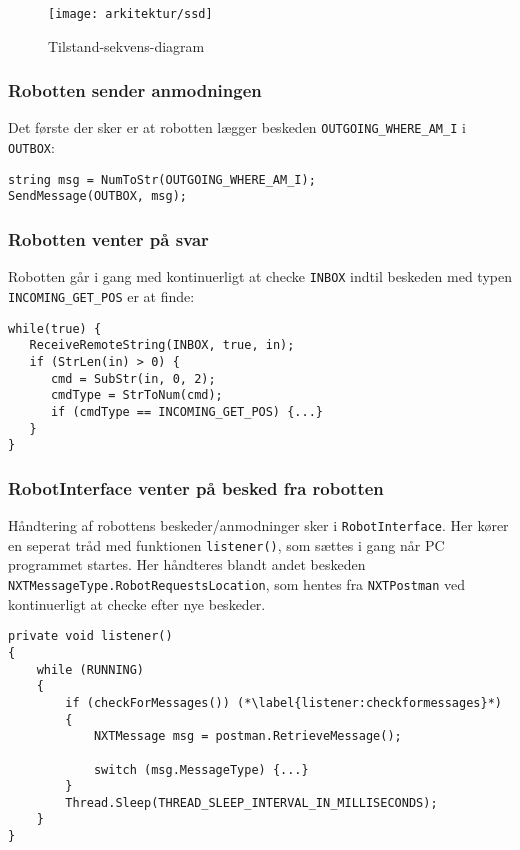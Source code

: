 \begin{figure}[h]
\centering
\texttt{[image: arkitektur/ssd]}
\caption{Tilstand-sekvens-diagram}
\label{flow:ssd}
\end{figure}

\subsubsection{Robotten sender anmodningen}
Det første der sker er at robotten lægger beskeden \lstinline[style=c]!OUTGOING_WHERE_AM_I! i \lstinline[style=c]!OUTBOX!:

\begin{lstlisting}[style=csmall,label=lst:whereami_request,caption=Robotten sender anmodning om positur]
string msg = NumToStr(OUTGOING_WHERE_AM_I);
SendMessage(OUTBOX, msg);
\end{lstlisting}

\subsubsection{Robotten venter på svar}
Robotten går i gang med kontinuerligt at checke \lstinline[style=c]!INBOX! indtil beskeden med typen \lstinline[style=c]!INCOMING_GET_POS! er at finde:

\begin{lstlisting}[style=csmall,label=lst:whereami_response,caption=Robotten venter på svar]
while(true) {
   ReceiveRemoteString(INBOX, true, in);
   if (StrLen(in) > 0) {
      cmd = SubStr(in, 0, 2);
      cmdType = StrToNum(cmd);
      if (cmdType == INCOMING_GET_POS) {...}
   }
}
\end{lstlisting}

\subsubsection{RobotInterface venter på besked fra robotten}
Håndtering af robottens beskeder/anmodninger sker i \lstinline[style=csharp]!RobotInterface!.
Her kører en seperat tråd med funktionen \lstinline[style=csharp]!listener()!, som sættes i gang når PC programmet startes.
Her håndteres blandt andet beskeden \lstinline[style=csharp]!NXTMessageType.RobotRequestsLocation!, som hentes fra \lstinline[style=csharp]!NXTPostman! ved kontinuerligt at checke efter nye beskeder.

\begin{lstlisting}[style=csharpsmall,label=lst:listener,caption=listener() i RobotInterface]
private void listener()
{
    while (RUNNING)
    {
        if (checkForMessages()) (*\label{listener:checkformessages}*) 
        {
            NXTMessage msg = postman.RetrieveMessage();

            switch (msg.MessageType) {...}
        }
        Thread.Sleep(THREAD_SLEEP_INTERVAL_IN_MILLISECONDS);
    }
}
\end{lstlisting}

